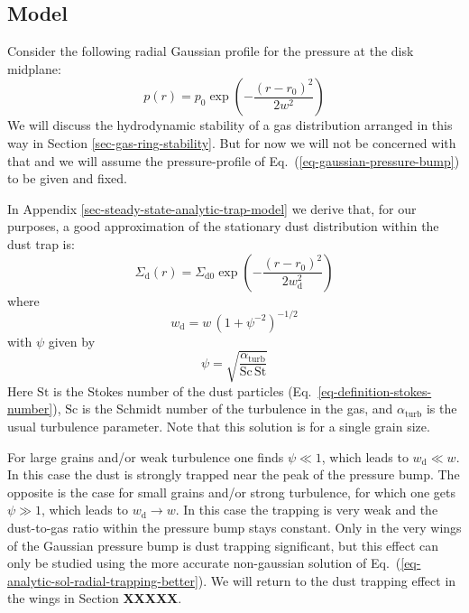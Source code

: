 \documentclass{aa}
\begin{document}
\subsection{Model}
\label{sec-model-dusttrap-rings}
%
Consider the following radial Gaussian profile for the
pressure at the disk midplane:
\begin{equation}\label{eq-gaussian-pressure-bump}
p(r) = p_0 \exp\left(-\frac{(r-r_0)^2}{2w^2}\right)
\end{equation}
We will discuss the hydrodynamic stability of a gas
distribution arranged in this way in Section \ref{sec-gas-ring-stability}. But
for now we will not be concerned with that and we will assume the
pressure-profile of Eq.~(\ref{eq-gaussian-pressure-bump}) to be given and fixed.

In Appendix \ref{sec-steady-state-analytic-trap-model} we derive that, for our
purposes, a good approximation of the stationary dust distribution within the
dust trap is:
\begin{equation}\label{eq-analytic-sol-radial-trapping-summary}
\Sigma_{\mathrm{d}}(r) = \Sigma_{\mathrm{d0}} \exp\left(-\frac{(r-r_0)^2}{2w_{\mathrm{d}}^2}\right)
\end{equation}
where
\begin{equation}\label{eq-wd-afo-w-psi}
  w_{\mathrm{d}} = w\,\left(1+\psi^{-2}\right)^{-1/2}
\end{equation}
with $\psi$ given by
\begin{equation}\label{eq-psi-afo-alpha-sc-st}
\psi = \sqrt{\frac{\alpha_{\mathrm{turb}}}{\mathrm{Sc}\,\mathrm{St}}}
\end{equation}
Here $\mathrm{St}$ is the Stokes number of the dust particles
(Eq.~\ref{eq-definition-stokes-number}), $\mathrm{Sc}$ is the Schmidt number of
the turbulence in the gas, and $\alpha_{\mathrm{turb}}$ is the usual turbulence
parameter. Note that this solution is for a single grain size.

For large grains and/or weak turbulence one finds $\psi\ll 1$, which leads to
$w_{\mathrm{d}}\ll w$. In this case the dust is strongly trapped near the peak
of the pressure bump. The opposite is the case for small grains and/or strong
turbulence, for which one gets $\psi\gg 1$, which leads to
$w_{\mathrm{d}}\rightarrow w$. In this case the trapping is very weak and the
dust-to-gas ratio within the pressure bump stays constant. Only in the very
wings of the Gaussian pressure bump is dust trapping significant, but this
effect can only be studied using the more accurate non-gaussian solution of
Eq.~(\ref{eq-analytic-sol-radial-trapping-better}). We will return to the dust
trapping effect in the wings in Section {\bf XXXXX}.
\end{document}
